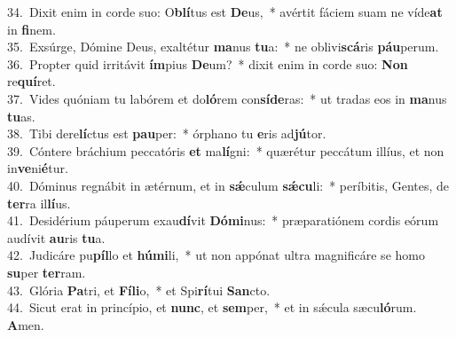 {34.~}Dixit enim in corde suo: O\textbf{blí}tus est \textbf{De}us,~* avértit fáciem suam ne víde\textbf{at} in \textbf{fi}nem.\\
{35.~}Exsúrge, Dómine Deus, exaltétur \textbf{ma}nus \textbf{tu}a:~* ne oblivi\textbf{scá}ris \textbf{páu}perum.\\
{36.~}Propter quid irritávit \textbf{ím}pius \textbf{De}um?~* dixit enim in corde suo: \textbf{Non} re\textbf{quí}ret.\\
{37.~}Vides quóniam tu labórem et do\textbf{ló}rem con\textbf{sí}\textbf{de}ras:~* ut tradas eos in \textbf{ma}nus \textbf{tu}as.\\
{38.~}Tibi dere\textbf{lí}ctus est \textbf{pau}per:~* órphano tu \textbf{e}ris ad\textbf{jú}tor.\\
{39.~}Cóntere bráchium peccatóris \textbf{et} ma\textbf{lí}gni:~* quærétur peccátum illíus, et non in\textbf{ve}ni\textbf{é}tur.\\
{40.~}Dóminus regnábit in ætérnum, et in \textbf{sǽ}culum \textbf{sǽ}\textbf{cu}li:~* períbitis, Gentes, de \textbf{ter}ra il\textbf{lí}us.\\
{41.~}Desidérium páuperum exau\textbf{dí}vit \textbf{Dó}\textbf{mi}nus:~* præparatiónem cordis eórum audívit \textbf{au}ris \textbf{tu}a.\\
{42.~}Judicáre pu\textbf{píl}lo et \textbf{hú}\textbf{mi}li,~* ut non appónat ultra magnificáre se homo \textbf{su}per \textbf{ter}ram.\\
{43.~}Glória \textbf{Pa}tri, et \textbf{Fí}\textbf{li}o,~* et Spi\textbf{rí}tui \textbf{San}cto.\\
{44.~}Sicut erat in princípio, et \textbf{nunc}, et \textbf{sem}per,~* et in sǽcula sæcu\textbf{ló}rum. \textbf{A}men.\\
